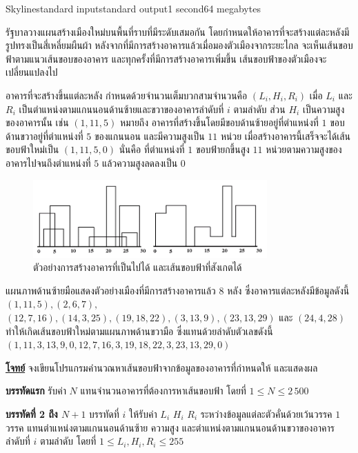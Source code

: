 \documentclass[11pt,a4paper]{article}
\begin{document}
\begin{problem}{Skyline}{standard input}{standard output}{1 second}{64 megabytes}

รัฐบาลวางแผนสร้างเมืองใหม่บนพื้นที่ราบที่มีระดับเสมอกัน โดยกำหนดให้อาคารที่จะสร้างแต่ละหลังมีรูปทรงเป็นสี่เหลี่ยมผืนผ้า หลังจากที่มีการสร้างอาคารแล้วเมื่อมองตัวเมืองจากระยะไกล จะเห็นเส้นขอบฟ้าตามแนวเส้นขอบของอาคาร และทุกครั้งที่มีการสร้างอาคารเพิ่มขึ้น เส้นขอบฟ้าของตัวเมืองจะเปลี่ยนแปลงไป

อาคารที่จะสร้างขึ้นแต่ละหลัง กำหนดด้วยจำนวนเต็มบวกสามจำนวนคือ $( L_i , H_i , R_i )$ เมื่อ $L_i$ และ $R_i$ เป็นตำแหน่งตามแกนนอนด้านซ้ายและขวาของอาคารลำดับที่ $i$ ตามลำดับ ส่วน $H_i$ เป็นความสูงของอาคารนั้น เช่น $(1, 11, 5)$ หมายถึง อาคารที่สร้างขึ้นโดยมีขอบด้านซ้ายอยู่ที่ตำแหน่งที่ $1$ ขอบด้านขวาอยู่ที่ตำแหน่งที่ $5$ ของแกนนอน และมีความสูงเป็น $11$ หน่วย เมื่อสร้างอาคารนี้เสร็จจะได้เส้นขอบฟ้าใหม่เป็น $(1, 11, 5, 0)$ นั่นคือ ที่ตำแหน่งที่ $1$ ขอบฟ้ายกขึ้นสูง $11$ หน่วยตามความสูงของอาคารไปจนถึงตำแหน่งที่ $5$ แล้วความสูงลดลงเป็น $0$

\begin{figure}[h]
\centering
\includegraphics[width=0.8\textwidth]{../latex/img/1008/1008-1.png}
\caption{ตัวอย่างการสร้างอาคารที่เป็นไปได้ และเส้นขอบฟ้าที่สังเกตได้}
\end{figure}


แผนภาพด้านซ้ายมือแสดงตัวอย่างเมืองที่มีการสร้างอาคารแล้ว $8$ หลัง ซึ่งอาคารแต่ละหลังมีข้อมูลดังนี้ $(1, 11, 5), (2, 6, 7),$ $(12, 7, 16), (14, 3, 25), (19, 18, 22), (3, 13, 9), (23, 13, 29)$ และ $(24, 4, 28)$ ทำให้เกิดเส้นขอบฟ้าใหม่ตามแผนภาพด้านขวามือ ซึ่งแทนด้วยลำดับตัวเลขดังนี้ $(1, 11, 3, 13, 9,0, 12, 7,16, 3, 19,18, 22,3, 23,13, 29,0)$ 


\underline{\textbf{โจทย์}} จงเขียนโปรแกรมคำนวณหาเส้นขอบฟ้าจากข้อมูลของอาคารที่กำหนดให้ และแสดงผล

\InputFile

\textbf{บรรทัดแรก}  รับค่า $N$ แทนจำนวนอาคารที่ต้องการหาเส้นขอบฟ้า โดยที่ $1 \leq N \leq 2\,500$ 

\textbf{บรรทัดที่ 2 ถึง $N+1$}  บรรทัดที่ $i$ ให้รับค่า $L_i$ $H_i$ $R_i$ ระหว่างข้อมูลแต่ละตัวคั่นด้วยเว้นวรรค $1$ วรรค แทนตำแหน่งตามแกนนอนด้านซ้าย ความสูง และตำแหน่งตามแกนนอนด้านขวาของอาคารลำดับที่ $i$ ตามลำดับ โดยที่ $1 \leq L_i , H_i , R_i \leq 255$ 


\end{problem}
\end{document}
